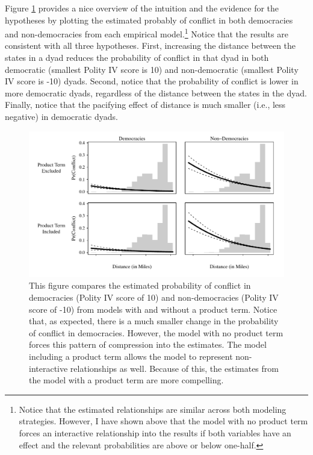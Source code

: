 \documentclass[12pt]{article}
\begin{document}
Figure \ref{fig:pr-distance} provides a nice overview of the intuition and the evidence for the hypotheses by plotting the estimated probably of conflict  in both democracies and non-democracies from each empirical model.\footnote{Notice that the estimated relationships are similar across both modeling strategies. However, I have shown above that the model with no product term forces an interactive relationship into the results if both variables have an effect and the relevant probabilities are above or below one-half.} Notice that the results are consistent with all three hypotheses. First, increasing the distance between the states in a dyad reduces the probability of conflict in that dyad in both democratic (smallest Polity IV score is 10) and non-democratic (smallest Polity IV score is -10) dyads. Second, notice that the probability of conflict is lower in more democratic dyads, regardless of the distance between the states in the dyad. Finally, notice that the pacifying effect of distance is much smaller (i.e., less negative) in democratic dyads. 

        \begin{figure}[H]
        \begin{center}
        \includegraphics[scale = .8]{fig/fig-pr-distance.pdf}
        \end{center}\caption{This figure compares the estimated probability of conflict in democracies (Polity IV score of 10) and non-democracies (Polity IV score of -10) from models with and without a product term. Notice that, as expected, there is a much smaller change in the probability of conflict in democracies. However, the model with no product term forces this pattern of compression into the estimates. The model including a product term allows the model to represent non-interactive relationships as well. Because of this, the estimates from the model with a product term are more compelling.}\label{fig:pr-distance}
        \end{figure}
\end{document}
